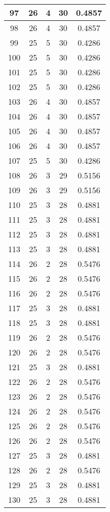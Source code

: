 \documentclass[letterpaper, 12pt]{article}
\begin{document}
\begin{longtable}{|c|c|c|c|c|}
\hline
97 & 26 & 4 & 30 & 0.4857 \\
\hline
98 & 26 & 4 & 30 & 0.4857 \\
\hline
99 & 25 & 5 & 30 & 0.4286 \\
\hline
100 & 25 & 5 & 30 & 0.4286 \\
\hline
101 & 25 & 5 & 30 & 0.4286 \\
\hline
102 & 25 & 5 & 30 & 0.4286 \\
\hline
103 & 26 & 4 & 30 & 0.4857 \\
\hline
104 & 26 & 4 & 30 & 0.4857 \\
\hline
105 & 26 & 4 & 30 & 0.4857 \\
\hline
106 & 26 & 4 & 30 & 0.4857 \\
\hline
107 & 25 & 5 & 30 & 0.4286 \\
\hline
108 & 26 & 3 & 29 & 0.5156 \\
\hline
109 & 26 & 3 & 29 & 0.5156 \\
\hline
110 & 25 & 3 & 28 & 0.4881 \\
\hline
111 & 25 & 3 & 28 & 0.4881 \\
\hline
112 & 25 & 3 & 28 & 0.4881 \\
\hline
113 & 25 & 3 & 28 & 0.4881 \\
\hline
114 & 26 & 2 & 28 & 0.5476 \\
\hline
115 & 26 & 2 & 28 & 0.5476 \\
\hline
116 & 26 & 2 & 28 & 0.5476 \\
\hline
117 & 25 & 3 & 28 & 0.4881 \\
\hline
118 & 25 & 3 & 28 & 0.4881 \\
\hline
119 & 26 & 2 & 28 & 0.5476 \\
\hline
120 & 26 & 2 & 28 & 0.5476 \\
\hline
121 & 25 & 3 & 28 & 0.4881 \\
\hline
122 & 26 & 2 & 28 & 0.5476 \\
\hline
123 & 26 & 2 & 28 & 0.5476 \\
\hline
124 & 26 & 2 & 28 & 0.5476 \\
\hline
125 & 26 & 2 & 28 & 0.5476 \\
\hline
126 & 26 & 2 & 28 & 0.5476 \\
\hline
127 & 25 & 3 & 28 & 0.4881 \\
\hline
128 & 26 & 2 & 28 & 0.5476 \\
\hline
129 & 25 & 3 & 28 & 0.4881 \\
\hline
130 & 25 & 3 & 28 & 0.4881 \\

\end{longtable}
\end{document}
